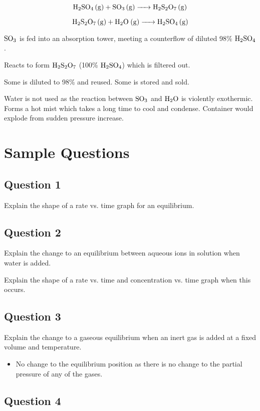 \documentclass[a4paper,11pt]{article}
\begin{document}
$$
\ce{H2SO4 (g) + SO3 (g) -> H2S2O7 (g)}
$$

$$
\ce{H2S2O7 (g) + H2O (g) -> H2SO4 (g)}
$$

$\ce{SO3}$ is fed into an absorption tower, meeting a counterflow of diluted
98\% $\ce{H2SO4}$.

Reacts to form $\ce{H2S2O7}$ (100\% $\ce{H2SO4}$) which is filtered out.

Some is diluted to 98\% and reused. Some is stored and sold.

Water is not used as the reaction between $\ce{SO3}$ and $\ce{H2O}$ is violently
exothermic. Forms a hot mist which takes a long time to cool and condense.
Container would explode from sudden pressure increase.




\section{Sample Questions}

\subsection{Question 1}

Explain the shape of a rate vs. time graph for an equilibrium.


\subsection{Question 2}

Explain the change to an equilibrium between aqueous ions in solution when water
is added.

Explain the shape of a rate vs. time and concentration vs. time graph when this
occurs.


\subsection{Question 3}

Explain the change to a gaseous equilibrium when an inert gas is added at a
fixed volume and temperature.

\begin{itemize}
\item No change to the equilibrium position as there is no change to the partial
	pressure of any of the gases.
\end{itemize}


\subsection{Question 4}
\end{document}
